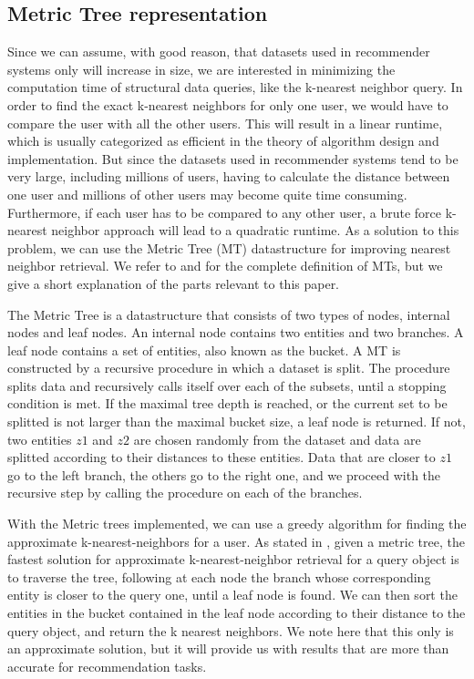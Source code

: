 \subsection{Metric Tree representation}
  Since we can assume, with good reason, that datasets used in recommender systems only will increase in size, we are interested in minimizing the computation time of structural data queries, like the k-nearest neighbor query.
  In order to find the exact k-nearest neighbors for only one user, we would have to compare the user with all the other users.
  This will result in a linear runtime, which is usually categorized as efficient in the theory of algorithm design and implementation. But since the datasets used in recommender systems tend to be very large, including millions of users, having to calculate the distance between one user and millions of other users may become quite time consuming.
  Furthermore, if each user has to be compared to any other user, a brute force k-nearest neighbor approach will lead to a quadratic runtime.
  As a solution to this problem, we can use the Metric Tree (MT) datastructure for improving nearest neighbor retrieval.
  We refer to \cite{jaeger2019counts} and \cite{uhlmann1991} for the complete definition of MTs, but we give a short explanation of the parts relevant to this paper.

  The Metric Tree is a datastructure that consists of two types of nodes, internal nodes and leaf nodes. An internal node contains two entities and two branches. A leaf node contains a set of entities, also known as the bucket.
  A MT is constructed by a recursive procedure in which a dataset is split. The procedure splits data and recursively calls itself over each of the subsets, until a stopping condition is met.
  If the maximal tree depth is reached, or the current set to be splitted is not larger than the maximal bucket size, a leaf node is returned.
  If not, two entities $z1$ and $z2$ are chosen randomly from the dataset and data are splitted according to their distances to these entities. Data that are closer to $z1$ go to the left branch, the others go to the right one, and we proceed with the recursive step by calling the procedure on each of the branches.

  With the Metric trees implemented, we can use a greedy algorithm for finding the approximate k-nearest-neighbors for a user.
  As stated in \cite{jaeger2019counts}, given a metric tree, the fastest solution for approximate k-nearest-neighbor retrieval for a query object is to traverse the tree, following at each node the branch whose corresponding entity is closer to the query one, until a leaf node is found.
  We can then sort the entities in the bucket contained in the leaf node according to their distance to the query object, and return the k nearest neighbors. We note here that this only is an approximate solution, but it will provide us with results that are more than accurate for recommendation tasks.
